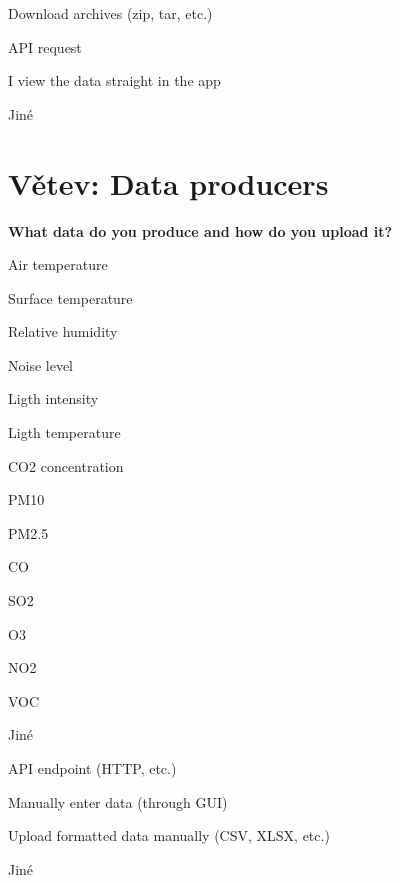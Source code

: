 \begin{choices}
\item Download archives (zip, tar, etc.)
\item API request
\item I view the data straight in the app
\item Jiné
\end{choices}


\section*{Větev: Data producers}

\textbf{What data do you produce and how do you upload it?}

\begin{choices}
\item Air temperature
\item Surface temperature
\item Relative humidity
\item Noise level
\item Ligth intensity
\item Ligth temperature
\item CO2 concentration
\item PM10
\item PM2.5
\item CO
\item SO2
\item O3
\item NO2
\item VOC
\item Jiné
\end{choices}

\begin{choices}
\item API endpoint (HTTP, etc.)
\item Manually enter data (through GUI)
\item Upload formatted data manually (CSV, XLSX, etc.)
\item Jiné
\end{choices}


